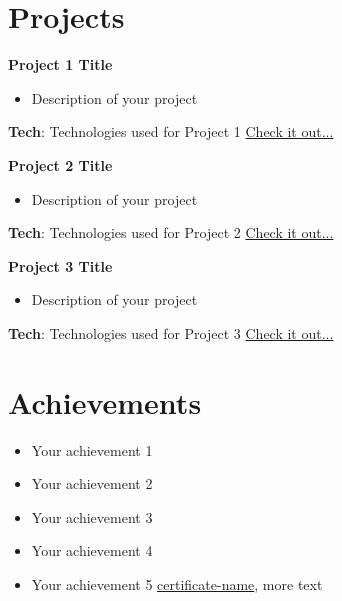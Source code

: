\documentclass[a4paper,11pt]{article}
\newcommand{\resumeItemListStart}{\begin{itemize}[label={$\bullet$}, leftmargin=*]}
\newcommand{\resumeItemListEnd}{\end{itemize}\vspace{-5pt}}
\begin{document}
\section{\textbf{{\LARGE Projects}}}
\begin{description}[font=$\bullet$]

  \item{\textbf{Project 1 Title}}
  \resumeItemListStart
    \item Description of your project
  \resumeItemListEnd
  \textbf{Tech}: Technologies used for Project 1
  \hfill \textcolor{blue}{\href{https://project1-link}{Check it out...}}

  \item{\textbf{Project 2 Title}}
  \resumeItemListStart
    \item Description of your project
  \resumeItemListEnd
  \textbf{Tech}: Technologies used for Project 2
  \hfill \textcolor{blue}{\href{https://project2-link}{Check it out...}}

  \item{\textbf{Project 3 Title}}
  \resumeItemListStart
    \item Description of your project
  \resumeItemListEnd
  \textbf{Tech}: Technologies used for Project 3
  \hfill \textcolor{blue}{\href{https://project3-link}{Check it out...}}
\end{description}


\section{\textbf{{\LARGE Achievements}}}
\begin{itemize}[label={$\bullet$}, leftmargin=*]

\item Your achievement 1
\item Your achievement 2
\item Your achievement 3
\item Your achievement 4

\item Your achievement 5 \textcolor{blue}{\href{https://certificate-link}{certificate-name}}, more text
\end{itemize}
\end{document}
